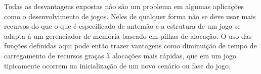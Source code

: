 Todas as desvantagens expostas não são um problema em algumas
aplicações como o desenvolvimento de jogos. Neles de qualquer forma
não se deve usar mais recursos do que o que é especificado de antemão
e a estrutura de um jogo se adapta à um gerenciador de memória baseado
em pilhas de alocação. O uso das funções definidas aqui pode então
trazer vantagens como diminuição de tempo de carregamento de recursos
graças à alocações mais rápidas, que em um jogo tipicamente ocorrem na
inicialização de um novo cenário ou fase do jogo.







\fim
